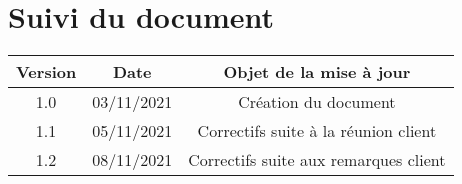 \documentclass[../main.tex]{subfiles}
\begin{document}
    \section{Suivi du document}
    \vspace{0.5cm}
    \begin{center}
        \begin{tabular}{|c|c|c|}
            \hline
            \rowcolor{Gray}Version & Date & Objet de la mise à jour \\
            \hline
            1.0 & 03/11/2021 & Création du document \\
            1.1 & 05/11/2021 & Correctifs suite à la réunion client \\
            1.2 & 08/11/2021 & Correctifs suite aux remarques client \\
            \hline
        \end{tabular}
    \end{center}
\end{document}

